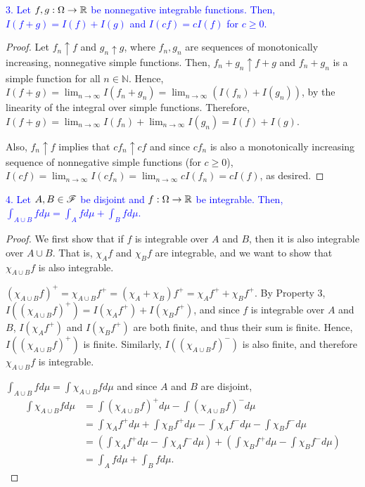 \textcolor{blue}{3. Let $f, g: \Omega \to \mathbb{R}$ be nonnegative integrable functions. Then, $I(f + g) = I(f) + I(g)$ and $I(cf) = cI(f)$ for $c \geq 0$.}

\begin{proof}    
    Let $f_n \uparrow f$ and $g_n \uparrow g$, where $f_n, g_n$ are sequences of monotonically increasing, nonnegative simple functions. Then, $f_n + g_n \uparrow f + g$ and $f_n + g_n$ is a simple function for all $n \in \mathbb{N}$. Hence, $I(f + g) = \lim_{n \to \infty} I(f_n + g_n) = \lim_{n \to \infty} (I(f_n) + I(g_n))$, by the linearity of the integral over simple functions. Therefore, $I(f + g) = \lim_{n \to \infty} I(f_n) + \lim_{n \to \infty}  I(g_n) = I(f) + I(g)$.
    
    Also, $f_n \uparrow f$ implies that $cf_n \uparrow cf$ and since $cf_n$ is also a monotonically increasing sequence of nonnegative simple functions (for $c \geq 0$), $I(cf) = \lim_{n \to \infty} I(cf_n) = \lim_{n \to \infty} cI(f_n) = cI(f)$, as desired. 
\end{proof}

\textcolor{blue}{4. Let $A, B \in \mathscr{F}$ be disjoint and $f: \Omega \to \mathbb{R}$ be integrable. Then, $\int_{A \cup B} f d\mu = \int_A f d\mu + \int_B f d\mu$.}

\begin{proof}
    We first show that if $f$ is integrable over $A$ and $B$, then it is also integrable over $A \cup B$. That is, $\chi_A f$ and $\chi_B f$ are integrable, and we want to show that $\chi_{A \cup B} f$ is also integrable.
    
    $(\chi_{A \cup B} f)^+ = \chi_{A \cup B} f^+ = (\chi_A + \chi_B)f^+ = \chi_Af^+ + \chi_B f^+$. By Property 3, $I((\chi_{A \cup B} f)^+) = I(\chi_Af^+) + I(\chi_Bf^+)$, and since $f$ is integrable over $A$ and $B$, $I(\chi_A f^+)$ and $I(\chi_B f^+)$ are both finite, and thus their sum is finite. Hence, $I((\chi_{A \cup B} f)^+)$ is finite. Similarly, $I((\chi_{A \cup B}f)^-)$ is also finite, and therefore $\chi_{A \cup B}f$ is integrable. 
    
    $\int_{A \cup B} f d\mu = \int \chi_{A \cup B} f d\mu$ and since $A$ and $B$ are disjoint, 
    \begin{align*}
        \int\chi_{A \cup B} f d\mu &= \int (\chi_{A \cup B} f)^+ d\mu - \int (\chi_{A \cup B} f)^-d\mu\\
        &= \int \chi_Af^+ d\mu + \int\chi_Bf^+ d\mu - \int \chi_A f^- d\mu - \int\chi_Bf^-d\mu \tag{by Property 3}\\
        &=  \left( \int\chi_Af^+ d\mu - \int\chi_Af^- d\mu \right) + \left( \int\chi_Bf^+ d\mu - \int\chi_Bf^- d\mu \right) \\
        &= \int_A f d\mu + \int_B fd\mu.
    \end{align*} 
\end{proof}

